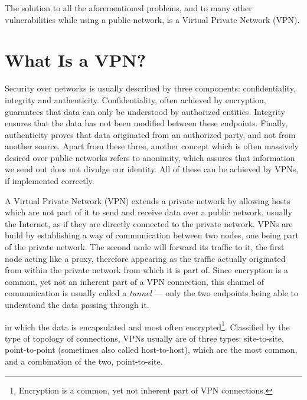 \documentclass[a4paper,12pt]{report}
\begin{document}
		The solution to all the aforementioned problems, and to many other vulnerabilities while using a public network, is a Virtual Private Network (VPN).
		
		\section{What Is a VPN?}
		Security over networks is usually described by three components: confidentiality, integrity and authenticity. Confidentiality, often achieved by encryption, guarantees that data can only be understood by authorized entities. Integrity ensures that the data has not been modified between these endpoints. Finally, authenticity proves that data originated from an authorized party, and not from another source. Apart from these three, another concept which is often massively desired over public networks refers to anonimity, which assures that information we send out does not divulge our identity. All of these can be achieved by VPNs, if implemented correctly.
		
		A Virtual Private Network (VPN) extends a private network by allowing hosts which are not part of it to send and receive data over a public network, usually the Internet, as if they are directly connected to the private network. VPNs are build by establishing a way of communication between two nodes, one being part of the private network. The second node will forward its traffic to it, the first node acting like a proxy, therefore appearing as the traffic actually originated from within the private network from which it is part of. Since encryption is a common, yet not an inherent part of a VPN connection, this channel of communication is usually called a \textit{tunnel} --- only the two endpoints being able to understand the data passing through it. 
		
		  in which the data is encapsulated and most often encrypted\footnote{Encryption is a common, yet not inherent part of VPN connections.}. Classified by the type of topology of connections, VPNs usually are of three types: site-to-site, point-to-point (sometimes also called host-to-host), which are the most common, and a combination of the two, point-to-site.
		
\end{document}
